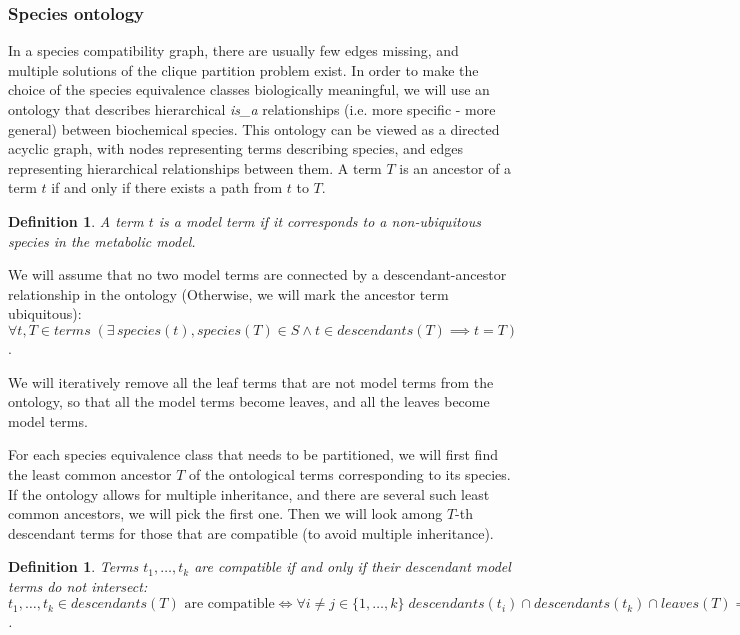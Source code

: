 \documentclass[10pt]{bmc_article}
\newenvironment{bmcformat}{\baselineskip20pt\sloppy\setboolean{publ}{false}}{\baselineskip20pt\sloppy}
\begin{document}
\begin{bmcformat}
\subsubsection*{Species ontology}
In a species compatibility graph, there are usually few edges missing, and multiple solutions of the clique partition problem exist. In order to make the choice of the species equivalence classes biologically meaningful, we will use an ontology that describes hierarchical \textit{is\_a} relationships (i.e. more specific - more general) between biochemical species. This ontology can be viewed as a directed acyclic graph, with nodes representing terms describing species, and edges representing hierarchical relationships between them. A term $T$ is an ancestor of a term $t$ if and only if there exists a path from $t$ to $T$. 

\newtheorem{mt}[def]{Definition}
\begin{mt}
A term $t$ is a model term if it corresponds to a non-ubiquitous species in the metabolic model. 
\end{mt}
We will assume that no two model terms are connected by a descendant-ancestor relationship in the ontology (Otherwise, we will mark the ancestor term ubiquitous): $\forall t, T \in terms \; (\exists\, species(t), species(T) \in S \land t \in descendants(T) \implies t = T)$.

We will iteratively remove all the leaf terms that are not model terms from the ontology, so that all the model terms become leaves, and all the leaves become model terms. 

For each species equivalence class that needs to be partitioned, we will first find the least common ancestor $T$ of the ontological terms corresponding to its species. If the ontology allows for multiple inheritance, and there are several such least common ancestors, we will pick the first one. Then we will look among $T$-th descendant terms for those that are compatible (to avoid multiple inheritance).

\newtheorem{comp}[def]{Definition}
\begin{comp}
Terms $ t_1, \ldots, t_k$ are compatible if and only if their descendant model terms do not intersect:
$ t_1, \ldots, t_k \in descendants(T) \text{ are compatible} \iff \forall i \neq j \in \{1, \ldots, k\} \; descendants(t_i) \cap descendants(t_k) \cap leaves(T) = \emptyset$.
\end{comp}


\end{bmcformat}
\end{document}
